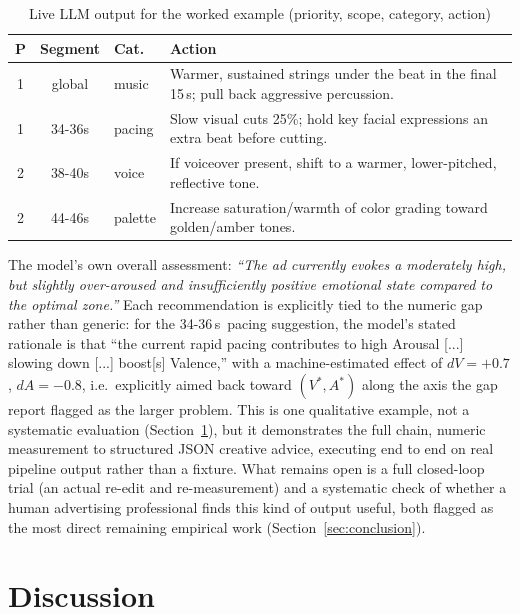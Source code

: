 \documentclass[conference]{IEEEtran}
\begin{document}
\begin{table}[!t]
\centering
\caption{Live LLM output for the worked example (priority, scope, category, action)}
\label{tab:advice}
\small
\begin{tabular}{cclp{4.7cm}}
\toprule
P & Segment & Cat. & Action \\
\midrule
1 & global & music & Warmer, sustained strings under the beat in the final 15\,s; pull back aggressive percussion. \\
1 & 34-36s & pacing & Slow visual cuts 25\%; hold key facial expressions an extra beat before cutting. \\
2 & 38-40s & voice & If voiceover present, shift to a warmer, lower-pitched, reflective tone. \\
2 & 44-46s & palette & Increase saturation/warmth of color grading toward golden/amber tones. \\
\bottomrule
\end{tabular}
\end{table}

The model's own overall assessment: \emph{``The ad currently evokes a
moderately high, but slightly over-aroused and insufficiently positive
emotional state compared to the optimal zone.''} Each recommendation is
explicitly tied to the numeric gap rather than generic: for the
34-36\,s\ pacing suggestion, the model's stated rationale is that
``the current rapid pacing contributes to high Arousal [...] slowing down
[...] boost[s] Valence,'' with a machine-estimated effect of
$dV{=}{+}0.7$, $dA{=}{-}0.8$, i.e.\ explicitly aimed back toward
$(V^{*},A^{*})$ along the axis the gap report flagged as the larger
problem. This is one qualitative example, not a systematic evaluation
(Section~\ref{sec:discussion}), but it demonstrates the full chain,
numeric measurement to structured JSON creative advice, executing
end to end on real pipeline output rather than a fixture. What remains
open is a full closed-loop trial (an actual re-edit and re-measurement)
and a systematic check of whether a human advertising professional finds
this kind of output useful, both flagged as the most direct remaining
empirical work (Section~\ref{sec:conclusion}).

\section{Discussion}
\label{sec:discussion}
\end{document}
